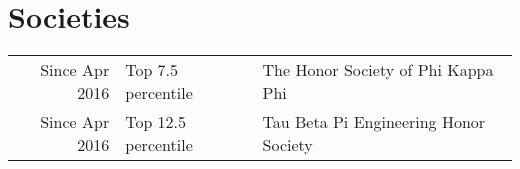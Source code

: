 \documentclass[]{deedy-resume-openfont}
\begin{document}
\begin{minipage}[t]{0.66\textwidth}

\section{Societies} 

\begin{tabular}{rll}
Since Apr 2016 & Top 7.5 percentile & The Honor Society of Phi Kappa Phi\\
Since Apr 2016 & Top 12.5 percentile & Tau Beta Pi Engineering Honor Society\\
\end{tabular}
\sectionsep

\end{minipage} 
\end{document}
